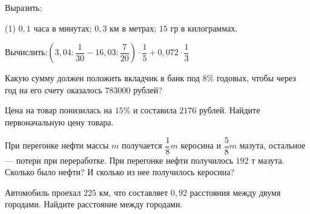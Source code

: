 %
%
\begin{exam}
	\begin{listofex}
		\item Выразить:
		\begin{tasks}(1)
			\task \(0,1\) часа в минутах;
			\task \(0,3\) км в метрах;
			\task \(15\) гр в килограммах.
		\end{tasks}
		\item Вычислить:\quad\(\left(3,04:\dfrac{1}{30}-16,03: \dfrac{7}{20}\right) \cdot \dfrac{1}{5} + 0,072 \cdot \dfrac{1}{3}\)
		\item Какую сумму должен положить вкладчик в банк под \( 8\% \) годовых, чтобы через год на его счету оказалось \( 783 000 \) рублей?
		\item Цена на товар понизилась на \(15\%\) и составила \(2176\) рублей. Найдите первоначальную цену товара.
		\item При перегонке нефти массы \( m \) получается \(\dfrac{1}{8}m\) керосина и \(\dfrac{5}{8}m \)  мазута, остальное --- потери при переработке. При перегонке нефти получилось \(192\) т мазута. Сколько было нефти? И сколько из нее получилось керосина?
		\item Автомобиль проехал \(225\) км, что составляет \(0,92\) расстояния между двумя городами. Найдите расстояние между городами.
	\end{listofex}
\end{exam}

